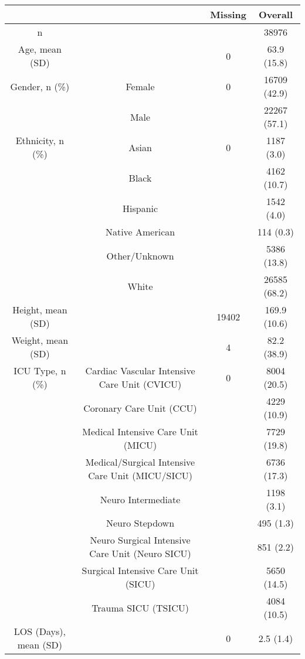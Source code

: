 \begin{tabular}{cccc}
\toprule
                               &   & Missing &       Overall \\
\midrule
n & {} &         &         38976 \\
Age, mean (SD) &   &       0 &   63.9 (15.8) \\
Gender, n (\%) & Female &       0 &  16709 (42.9) \\
                               & Male &         &  22267 (57.1) \\
Ethnicity, n (\%) & Asian &       0 &    1187 (3.0) \\
                               & Black &         &   4162 (10.7) \\
                               & Hispanic &         &    1542 (4.0) \\
                               & Native American &         &     114 (0.3) \\
                               & Other/Unknown &         &   5386 (13.8) \\
                               & White &         &  26585 (68.2) \\
Height, mean (SD) &   &   19402 &  169.9 (10.6) \\
Weight, mean (SD) &   &       4 &   82.2 (38.9) \\
ICU Type, n (\%) & Cardiac Vascular Intensive Care Unit (CVICU) &       0 &   8004 (20.5) \\
                               & Coronary Care Unit (CCU) &         &   4229 (10.9) \\
                               & Medical Intensive Care Unit (MICU) &         &   7729 (19.8) \\
                               & Medical/Surgical Intensive Care Unit (MICU/SICU) &         &   6736 (17.3) \\
                               & Neuro Intermediate &         &    1198 (3.1) \\
                               & Neuro Stepdown &         &     495 (1.3) \\
                               & Neuro Surgical Intensive Care Unit (Neuro SICU) &         &     851 (2.2) \\
                               & Surgical Intensive Care Unit (SICU) &         &   5650 (14.5) \\
                               & Trauma SICU (TSICU) &         &   4084 (10.5) \\
LOS (Days), mean (SD) &   &       0 &     2.5 (1.4) \\

\end{tabular}
